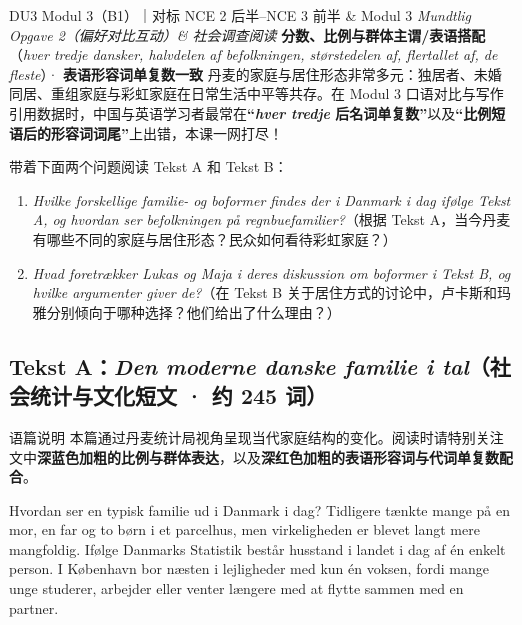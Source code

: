 {DU3 Modul 3（B1）｜对标 NCE 2 后半--NCE 3 前半 \& Modul 3 \textit{Mundtlig Opgave 2（偏好对比互动）\& 社会调查阅读}}
{\textbf{分数、比例与群体主谓/表语搭配}（\textit{hver tredje dansker, halvdelen af befolkningen, størstedelen af, flertallet af, de fleste}）· \textbf{表语形容词单复数一致}}
{丹麦的家庭与居住形态非常多元：独居者、未婚同居、重组家庭与彩虹家庭在日常生活中平等共存。在 Modul 3 口语对比与写作引用数据时，中国与英语学习者最常在\textbf{“\textit{hver tredje} 后名词单复数”}以及\textbf{“比例短语后的形容词词尾”}上出错，本课一网打尽！}

\begin{foerduleaeser}
带着下面两个问题阅读 Tekst A 和 Tekst B：
\begin{enumerate}
  \item \textit{Hvilke forskellige familie- og boformer findes der i Danmark i dag ifølge Tekst A, og hvordan ser befolkningen på regnbuefamilier?}（根据 Tekst A，当今丹麦有哪些不同的家庭与居住形态？民众如何看待彩虹家庭？）
  \item \textit{Hvad foretrækker Lukas og Maja i deres diskussion om boformer i Tekst B, og hvilke argumenter giver de?}（在 Tekst B 关于居住方式的讨论中，卢卡斯和玛雅分别倾向于哪种选择？他们给出了什么理由？）
\end{enumerate}
\end{foerduleaeser}


\subsection*{Tekst A：\textit{Den moderne danske familie i tal}（社会统计与文化短文 · 约 245 词）}

\begin{tipbox}{语篇说明}
本篇通过丹麦统计局视角呈现当代家庭结构的变化。阅读时请特别关注文中\textbf{\color{NCDNavy}深蓝色加粗的比例与群体表达}，以及\textbf{\color{NCDRed}深红色加粗的表语形容词与代词单复数配合}。
\end{tipbox}

Hvordan ser en typisk familie ud i Danmark i dag? Tidligere tænkte mange på en mor, en far og to børn i et parcelhus, men virkeligheden er blevet langt mere mangfoldig. Ifølge Danmarks Statistik består  husstand i landet i dag af én enkelt person. I København bor næsten  i lejligheder med kun én voksen, fordi mange unge studerer, arbejder eller venter længere med at flytte sammen med en partner.

